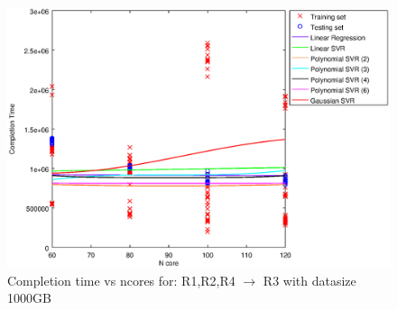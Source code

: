 
\begin {figure}[hbtp]
\centering
\includegraphics[width=\textwidth]{output/R1,R2,R4_R3_1000_ALL_FEATURES/plot_R1,R2,R4_R3_1000.eps}
\caption{Completion time vs ncores for: R1,R2,R4 $\rightarrow$ R3 with datasize 1000GB}
\label{fig:coreonly_linear_R1,R2,R4_R3_1000}
\end {figure}
